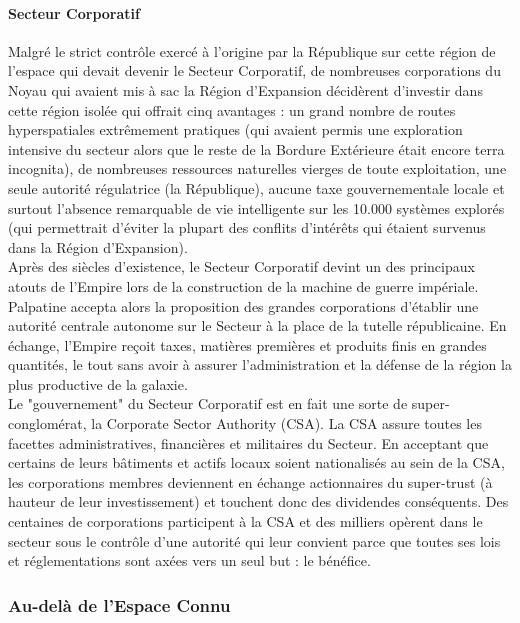 \documentclass[twoside]{article}
\begin{document}
\paragraph{Secteur Corporatif}
Malgré le strict contrôle exercé à l'origine par la République sur cette région de l'espace qui devait devenir le Secteur Corporatif, de  nombreuses corporations du Noyau qui avaient mis à sac la Région d'Expansion décidèrent d'investir dans cette région isolée qui offrait cinq avantages : un grand nombre de routes hyperspatiales extrêmement pratiques (qui avaient permis une exploration intensive du secteur alors que le reste de la Bordure Extérieure était encore terra incognita), de nombreuses ressources naturelles vierges de toute exploitation, une seule autorité régulatrice (la République), aucune taxe gouvernementale locale et surtout l'absence remarquable de vie intelligente sur les 10.000 systèmes explorés (qui permettrait d'éviter la plupart des conflits d'intérêts qui étaient survenus dans la Région d'Expansion).\\

Après des siècles d'existence, le Secteur Corporatif devint un des principaux atouts de l'Empire lors de la construction de la machine de guerre impériale. Palpatine accepta alors la proposition des grandes corporations d'établir une autorité centrale autonome sur le Secteur à la place de la tutelle républicaine. En échange, l'Empire reçoit taxes, matières premières et produits finis en grandes quantités, le tout sans avoir à assurer l'administration et la défense de la région la plus productive de la galaxie.\\

Le "gouvernement" du Secteur Corporatif est en fait une sorte de super-conglomérat, la Corporate Sector Authority (CSA). La CSA assure toutes les facettes administratives, financières et militaires du Secteur. En acceptant que certains de leurs bâtiments et actifs locaux soient nationalisés au sein de la CSA, les corporations membres deviennent en échange actionnaires du super-trust (à hauteur de leur investissement) et touchent donc des dividendes conséquents. Des centaines de corporations participent à la CSA et des milliers opèrent dans le secteur sous le contrôle d'une autorité qui leur convient parce que toutes ses lois et réglementations sont axées vers un seul but : le bénéfice.

\subsubsection{Au-delà de l'Espace Connu}
\end{document}
